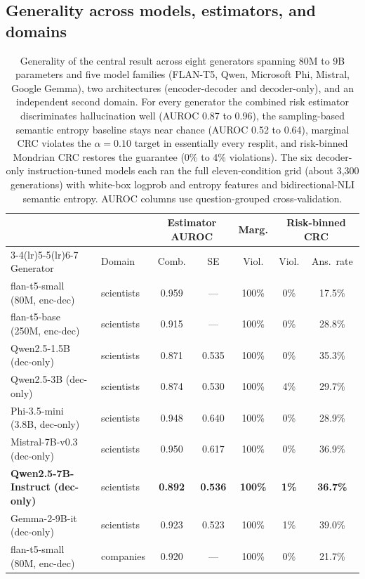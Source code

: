 \documentclass[11pt]{article}
\begin{document}
\subsection{Generality across models, estimators, and domains}
\label{sec:generality}

\begin{table}[tbp]
\centering\small
\caption{Generality of the central result across eight generators
spanning 80M to 9B parameters and five model families (FLAN-T5, Qwen,
Microsoft Phi, Mistral, Google Gemma), two architectures
(encoder-decoder and decoder-only), and an independent second domain.
For every generator the combined risk estimator discriminates
hallucination well (AUROC 0.87 to 0.96), the sampling-based semantic
entropy baseline stays near chance (AUROC 0.52 to 0.64), marginal CRC
violates the $\alpha = 0.10$ target in essentially every resplit, and
risk-binned Mondrian CRC restores the guarantee (0\% to 4\%
violations). The six decoder-only instruction-tuned models each ran the
full eleven-condition grid (about 3{,}300 generations) with white-box
logprob and entropy features and bidirectional-NLI semantic entropy.
AUROC columns use question-grouped cross-validation.}
\label{tab:generality}
\begin{tabular}{llccccc}
\toprule
& & \multicolumn{2}{c}{Estimator AUROC} &
\multicolumn{1}{c}{Marg.} & \multicolumn{2}{c}{Risk-binned CRC} \\
\cmidrule(lr){3-4}\cmidrule(lr){5-5}\cmidrule(lr){6-7}
Generator & Domain & Comb. & SE & Viol. & Viol. & Ans.\ rate \\
\midrule
flan-t5-small (80M, enc-dec)    & scientists & 0.959 & ---   & 100\% & 0\% & 17.5\% \\
flan-t5-base (250M, enc-dec)    & scientists & 0.915 & ---   & 100\% & 0\% & 28.8\% \\
Qwen2.5-1.5B (dec-only)         & scientists & 0.871 & 0.535 & 100\% & 0\% & 35.3\% \\
Qwen2.5-3B (dec-only)           & scientists & 0.874 & 0.530 & 100\% & 4\% & 29.7\% \\
Phi-3.5-mini (3.8B, dec-only)   & scientists & 0.948 & 0.640 & 100\% & 0\% & 28.9\% \\
Mistral-7B-v0.3 (dec-only)      & scientists & 0.950 & 0.617 & 100\% & 0\% & 36.9\% \\
\textbf{Qwen2.5-7B-Instruct (dec-only)} & scientists & \textbf{0.892} & \textbf{0.536} & \textbf{100\%} & \textbf{1\%} & \textbf{36.7\%} \\
Gemma-2-9B-it (dec-only)        & scientists & 0.923 & 0.523 & 100\% & 1\% & 39.0\% \\
flan-t5-small (80M, enc-dec)    & companies  & 0.920 & ---   & 100\% & 0\% & 21.7\% \\
\bottomrule
\end{tabular}
\end{table}
\end{document}
